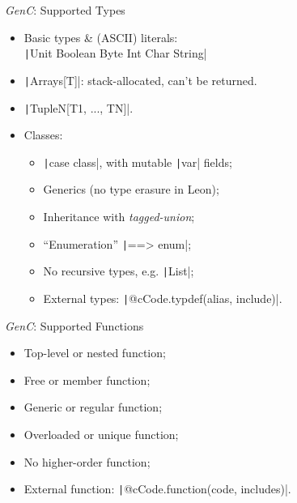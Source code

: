 \documentclass[xcolor={usenames,dvipsnames}]{beamer}
\newcommand{\GenC}{\emph{GenC}\xspace}
\newcommand{\InlineC}[1]{\texttt|#1|}
\newcommand{\InlineS}[1]{\texttt|#1|}
\begin{document}
\begin{frame}[fragile]{\GenC: Supported Types}
  \begin{itemize}
    \item Basic types \& (ASCII) literals:\\
          \InlineS{Unit Boolean Byte Int Char String}
    \item \InlineS{Arrays[T]}: stack-allocated, \alert{can't be returned}.
    \item \InlineS{TupleN[T1, ..., TN]}.
    \item Classes:
      \begin{itemize}
        \item \InlineS{case class}, with mutable \InlineS{var} fields;
        \item Generics {\small (no type erasure in Leon)};
        \item Inheritance with \emph{tagged-union};
        \item ``Enumeration'' \InlineC{==> enum};
        \item \alert{No recursive types}, e.g. \InlineS{List};
        \item External types: \InlineS{@cCode.typdef(alias, include)}.
      \end{itemize}
  \end{itemize}
\end{frame}


\begin{frame}{\GenC: Supported Functions}
  \begin{itemize}
    \item Top-level or nested function;
    \item Free or member function;
    \item Generic or regular function;
    \item Overloaded or unique function;
    \item \alert{No higher-order function};
    \item External function: \InlineS{@cCode.function(code, includes)}.
  \end{itemize}
\end{frame}
\end{document}

